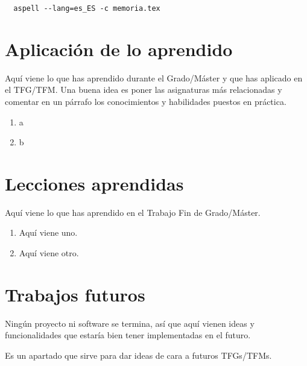 \documentclass[a4paper, 12pt]{book}
\begin{document}
\begin{verbatim}
  aspell --lang=es_ES -c memoria.tex
\end{verbatim}

\section{Aplicación de lo aprendido}
\label{sec:aplicacion}

Aquí viene lo que has aprendido durante el Grado/Máster y que has aplicado en el TFG/TFM. Una buena idea es poner las asignaturas más relacionadas y comentar en un párrafo los conocimientos y habilidades puestos en práctica.

\begin{enumerate}
  \item a
  \item b
\end{enumerate}


\section{Lecciones aprendidas}
\label{sec:lecciones_aprendidas}

Aquí viene lo que has aprendido en el Trabajo Fin de Grado/Máster.

\begin{enumerate}
  \item Aquí viene uno.
  \item Aquí viene otro.
\end{enumerate}


\section{Trabajos futuros}
\label{sec:trabajos_futuros}

Ningún proyecto ni software se termina, así que aquí vienen ideas y funcionalidades que estaría bien tener implementadas en el futuro.

Es un apartado que sirve para dar ideas de cara a futuros TFGs/TFMs.



\printglossary[type=\acronymtype]

\printglossary
\end{document}
